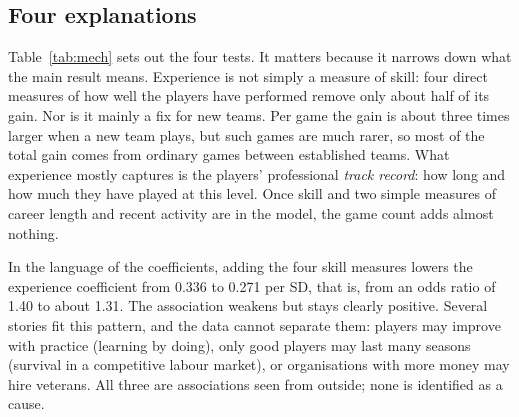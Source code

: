 \documentclass[12pt,a4paper]{article}
\begin{document}
\subsection{Four explanations}


Table~\ref{tab:mech} sets out the four tests. It matters because it narrows down what the main result means. Experience is not simply a measure of skill: four direct measures of how well the players have performed remove only about half of its gain. Nor is it mainly a fix for new teams. Per game the gain is about three times larger when a new team plays, but such games are much rarer, so most of the total gain comes from ordinary games between established teams. What experience mostly captures is the players' professional \emph{track record}: how long and how much they have played at this level. Once skill and two simple measures of career length and recent activity are in the model, the game count adds almost nothing.

In the language of the coefficients, adding the four skill measures lowers the experience coefficient from 0.336 to 0.271 per SD, that is, from an odds ratio of 1.40 to about 1.31. The association weakens but stays clearly positive. Several stories fit this pattern, and the data cannot separate them: players may improve with practice (learning by doing), only good players may last many seasons (survival in a competitive labour market), or organisations with more money may hire veterans. All three are associations seen from outside; none is identified as a cause.
\end{document}
